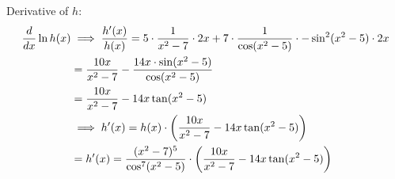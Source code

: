 \documentclass[nooutcomes]{ximera}
\begin{document}
\begin{problem}
\begin{enumerate}
\begin{freeResponse}
            Derivative of $h$:
            \begin{align*}
              \frac{d}{dx} \ln h(x) &\implies \frac{h'(x)}{h(x)} = 5 \cdot \frac{1}{x^2 - 7} \cdot 2x + 7 \cdot\frac{1}{\cos(x^2 - 5)} \cdot - \sin^2(x^2-5) \cdot 2x\\
                            &= \frac{10x}{x^2-7} - \frac{14x \cdot \sin(x^2 - 5)}{\cos(x^2 - 5)}\\
              &= \frac{10x}{x^2-7} - 14x \tan(x^2-5) \\
              &\implies h'(x) = h(x)\cdot \left( \frac{10x}{x^2-7} - 14x \tan(x^2-5) \right) \\
              &= h'(x) = \frac{(x^2 - 7)^5}{\cos^7(x^2 - 5)} \cdot \left( \frac{10x}{x^2-7} - 14x \tan(x^2-5) \right)
            \end{align*}
	\end{freeResponse}
	\end{enumerate}
\end{problem}
\end{document}

